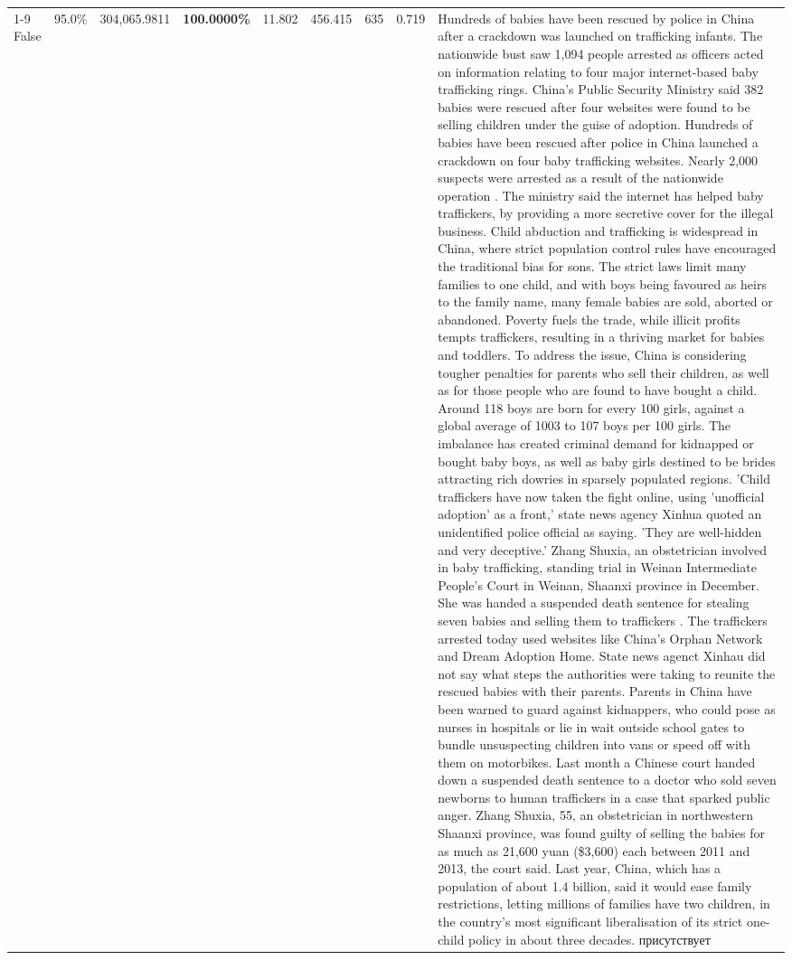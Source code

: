 \begin{table}[H]
\begin{tabular}{lllrlllll}
\cline{1-9}
False & 95.0\% & 304,065.9811 & \bfseries \color{red} 100.0000\% & 11.802 & 456.415 & 635 & 0.719 & Hundreds of babies have been rescued by police in China after a crackdown was launched on trafficking infants. The nationwide bust saw 1,094 people arrested as officers acted on information relating to four major internet-based baby trafficking rings. China's Public Security Ministry said 382 babies were rescued after four websites were found to be selling children under the guise of adoption. Hundreds of babies have been rescued after police in China launched a crackdown on four baby trafficking websites. Nearly 2,000 suspects were arrested as a result of the nationwide operation . The ministry said the internet has helped baby traffickers, by providing a more secretive cover for the illegal business. Child abduction and trafficking is widespread in China, where strict population control rules have encouraged the traditional bias for sons. The strict laws limit many families to one child, and with boys being favoured as heirs to the family name, many female babies are sold, aborted or abandoned. Poverty fuels the trade, while illicit profits tempts traffickers, resulting in a thriving market for babies and toddlers. To address the issue, China is considering tougher penalties for parents who sell their children, as well as for those people who are found to have bought a child. Around 118 boys are born for every 100 girls, against a global average of 1003 to 107 boys per 100 girls. The imbalance has created criminal demand for kidnapped or bought baby boys, as well as baby girls destined to be brides attracting rich dowries in sparsely populated regions. 'Child traffickers have now taken the fight online, using 'unofficial adoption' as a front,' state news agency Xinhua quoted an unidentified police official as saying. 'They are well-hidden and very deceptive.' Zhang Shuxia, an obstetrician involved in baby trafficking, standing trial in Weinan Intermediate People's Court in Weinan, Shaanxi province in December. She was handed a suspended death sentence for stealing seven babies and selling them to traffickers . The traffickers arrested today used websites like China's Orphan Network and Dream Adoption Home. State news agenct Xinhau did not say what steps the authorities were taking to reunite the rescued babies with their parents. Parents in China have been warned to guard against kidnappers, who could pose as nurses in hospitals or lie in wait outside school gates to bundle unsuspecting children into vans or speed off with them on motorbikes. Last month a Chinese court handed down a suspended death sentence to a doctor who sold seven newborns to human traffickers in a case that sparked public anger. Zhang Shuxia, 55, an obstetrician in northwestern Shaanxi province, was found guilty of selling the babies for as much as 21,600 yuan (\$3,600) each between 2011 and 2013, the court said. Last year, China, which has a population of about 1.4 billion, said it would ease family restrictions, letting millions of families have two children, in the country's most significant liberalisation of its strict one-child policy in about three decades. присутствует \\

\end{tabular}
\end{table}
